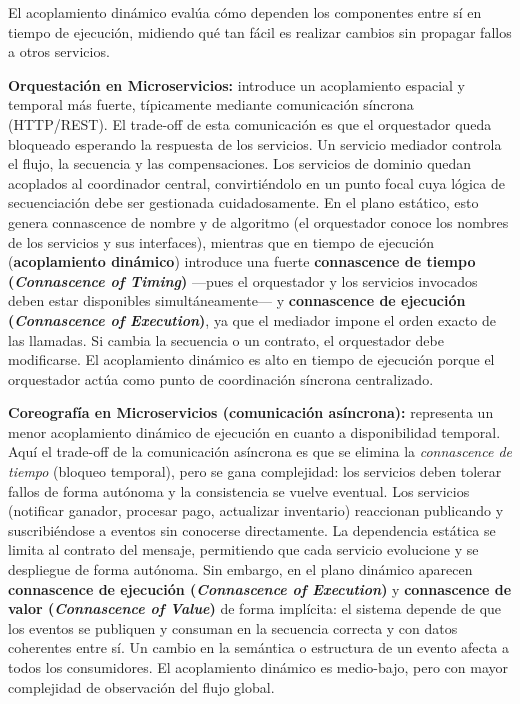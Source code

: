 \documentclass[12pt, a4paper]{article}
\begin{document}
    El acoplamiento dinámico evalúa cómo dependen los componentes entre sí en tiempo de ejecución, midiendo qué tan fácil es realizar cambios sin propagar fallos a otros servicios.

    \textbf{Orquestación en Microservicios:} introduce un acoplamiento espacial y temporal más fuerte, típicamente mediante comunicación síncrona (HTTP/REST). El trade-off de esta comunicación es que el orquestador queda bloqueado esperando la respuesta de los servicios. Un servicio mediador controla el flujo, la secuencia y las compensaciones. Los servicios de dominio quedan acoplados al coordinador central, convirtiéndolo en un punto focal cuya lógica de secuenciación debe ser gestionada cuidadosamente. En el plano estático, esto genera connascence de nombre y de algoritmo (el orquestador conoce los nombres de los servicios y sus interfaces), mientras que en tiempo de ejecución (\textbf{acoplamiento dinámico}) introduce una fuerte \textbf{connascence de tiempo (\textit{Connascence of Timing})} —pues el orquestador y los servicios invocados deben estar disponibles simultáneamente— y \textbf{connascence de ejecución (\textit{Connascence of Execution})}, ya que el mediador impone el orden exacto de las llamadas. Si cambia la secuencia o un contrato, el orquestador debe modificarse. El acoplamiento dinámico es alto en tiempo de ejecución porque el orquestador actúa como punto de coordinación síncrona centralizado.

    \textbf{Coreografía en Microservicios (comunicación asíncrona):} representa un menor acoplamiento dinámico de ejecución en cuanto a disponibilidad temporal. Aquí el trade-off de la comunicación asíncrona es que se elimina la \textit{connascence de tiempo} (bloqueo temporal), pero se gana complejidad: los servicios deben tolerar fallos de forma autónoma y la consistencia se vuelve eventual. Los servicios (notificar ganador, procesar pago, actualizar inventario) reaccionan publicando y suscribiéndose a eventos sin conocerse directamente. La dependencia estática se limita al contrato del mensaje, permitiendo que cada servicio evolucione y se despliegue de forma autónoma. Sin embargo, en el plano dinámico aparecen \textbf{connascence de ejecución (\textit{Connascence of Execution})} y \textbf{connascence de valor (\textit{Connascence of Value})} de forma implícita: el sistema depende de que los eventos se publiquen y consuman en la secuencia correcta y con datos coherentes entre sí. Un cambio en la semántica o estructura de un evento afecta a todos los consumidores. El acoplamiento dinámico es medio-bajo, pero con mayor complejidad de observación del flujo global.
\end{document}
